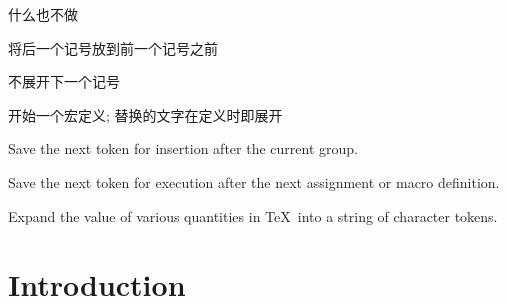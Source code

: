 \documentclass{book}
\begin{document}
\begin{inventory}
\item [\cs{relax}] 
     什么也不做


\item [\cs{expandafter}]  
	   将后一个记号放到前一个记号之前

\item [\cs{noexpand}]   
      不展开下一个记号


\item [\cs{edef}] 
      开始一个宏定义;
      替换的文字在定义时即展开

% 
 
\item [\cs{aftergroup}]  
      Save the next token for insertion after the current group.

\item [\cs{afterassignment}]   
      Save the next token for execution after the next assignment
      or macro definition.


\item [\cs{the}] 
      Expand the value of various quantities in \TeX\ into a string
      of character tokens.

\end{inventory}


\section{Introduction}
\end{document}
